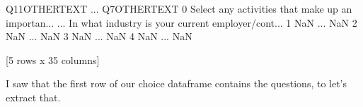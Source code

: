 \documentclass[letterpaper,10pt,english]{jupyterBook}
\begin{document}
\begin{sphinxVerbatim}[commandchars=\\\{\}]
                                      Q11\PYGZus{}OTHER\PYGZus{}TEXT  ...                                      Q7\PYGZus{}OTHER\PYGZus{}TEXT
0  Select any activities that make up an importan...  ...  In what industry is your current employer/cont...
1                                                NaN  ...                                                NaN
2                                                NaN  ...                                                NaN
3                                                NaN  ...                                                NaN
4                                                NaN  ...                                                NaN

[5 rows x 35 columns]
\end{sphinxVerbatim}

\sphinxAtStartPar
I saw that the first row of our choice dataframe contains the questions, to let’s extract that.

\begin{sphinxVerbatim}[commandchars=\\\{\}]
  \PYG{p}{[}\PYG{p}{]}
  
\end{sphinxVerbatim}

\begin{sphinxVerbatim}[commandchars=\\\{\}]
\end{sphinxVerbatim}
\end{document}
